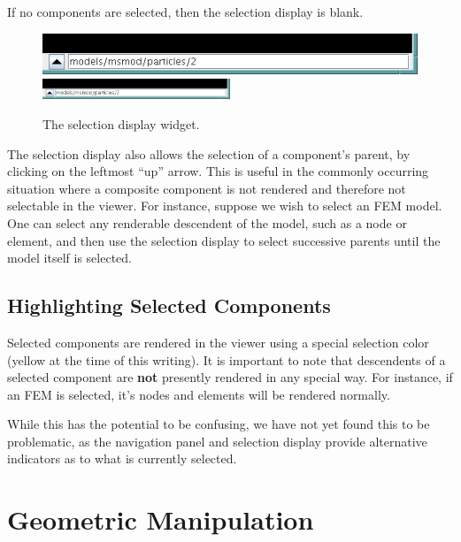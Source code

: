 \documentclass{article}
\begin{document}
If no components are selected, then the selection display is blank.

\begin{figure}
\begin{center}
\iflatexml
\includegraphics[]{images/selectionDisplay}
\else
\includegraphics[width=0.50\textwidth]{images/selectionDisplay}
\fi
\end{center}
\caption{The selection display widget.}%
\label{selectionDisplayWidgetFig}
\end{figure}

The selection display also allows the selection of a component's
parent, by clicking on the leftmost ``up'' arrow. This is useful in
the commonly occurring situation where a composite component is not
rendered and therefore not selectable in the viewer. For instance,
suppose we wish to select an FEM model. One can select any renderable
descendent of the model, such as a node or element, and then use
the selection display to select successive parents until the model
itself is selected.

\subsection{Highlighting Selected Components}

Selected components are rendered in the viewer using a special
selection color (yellow at the time of this writing). It is important
to note that descendents of a selected component are {\bf not} presently
rendered in any special way. For instance, if an FEM is selected, it's
nodes and elements will be rendered normally. 

While this has the potential to be confusing, we have not yet found
this to be problematic, as the navigation panel and selection display
provide alternative indicators as to what is currently selected.

\section{Geometric Manipulation}

\end{document}

